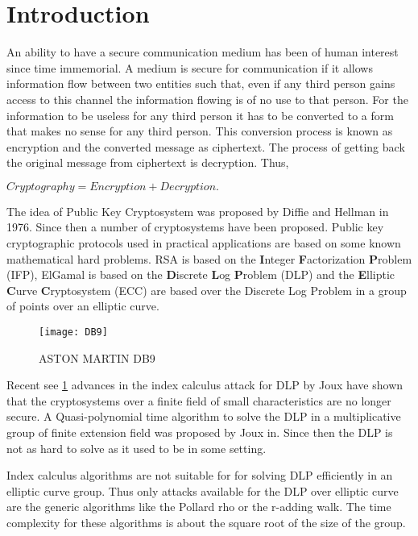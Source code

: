 
\section{Introduction}

An ability to have a secure communication medium has been of human interest since time immemorial.
A medium is secure for communication if it allows information flow between two entities such that, even if any third person 
gains access to this channel the information flowing is of no use to that person.
For the information to be useless for any third person it has to be converted to a form that makes no sense for any third person.
This conversion process is known as encryption and the converted message as ciphertext. 
The process of getting back the original message from ciphertext is decryption.
Thus,

\begin{center}
$\displaystyle
        Cryptography  = Encryption + Decryption. 
$
\end{center}

The idea of Public Key Cryptosystem was proposed by Diffie and Hellman in 1976. Since then a number of cryptosystems have been proposed.
Public key cryptographic protocols used in practical applications are based on some known mathematical hard problems.
RSA is based on the \textbf{I}nteger \textbf{F}actorization \textbf{P}roblem (IFP), ElGamal is based on the \textbf{D}iscrete \textbf{L}og 
\textbf{P}roblem (DLP) and the \cite{einstein}
\textbf{E}lliptic \textbf{C}urve \textbf{C}ryptosystem (ECC) are based over the Discrete Log Problem in a group of points over an elliptic curve.

\begin{figure}[h]
\centering
\texttt{[image: DB9]}
\caption{ASTON MARTIN DB9}
\label{DB9}
\end{figure}

Recent see \ref{DB9} advances in the index calculus attack for DLP by Joux have shown that the cryptosystems over a finite field of small characteristics are no longer
secure.
A Quasi-polynomial time algorithm to solve the DLP in a multiplicative group of finite extension field was proposed by Joux in. Since then the DLP
is not as hard to solve as it used to be in some setting.

Index calculus algorithms are not suitable for for solving DLP efficiently in an elliptic curve group.
Thus only attacks available for the DLP over elliptic curve are the generic algorithms like the Pollard rho or the r-adding walk.
The time complexity for these algorithms is about the square root of the size of the group.

